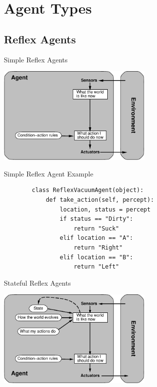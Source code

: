 \documentclass[14pt]{beamer}
\begin{document}
\section{Agent Types}

\subsection{Reflex Agents}

\begin{frame}{Simple Reflex Agents}
	\begin{center}
		\includegraphics[width=3in]{simple-reflex-agent.pdf}
	\end{center}
\end{frame}

\begin{frame}[fragile]{Simple Reflex Agent Example}
	\begin{lstlisting}
		class ReflexVacuumAgent(object):
		    def take_action(self, percept):
		        location, status = percept
		        if status == "Dirty":
		            return "Suck"
		        elif location == "A":
		            return "Right"
		        elif location == "B":
		            return "Left"
	\end{lstlisting}
\end{frame}

\begin{frame}{Stateful Reflex Agents}
	\begin{center}
		\includegraphics[width=3in]{reflex+state-agent.pdf}
	\end{center}
\end{frame}
\end{document}
